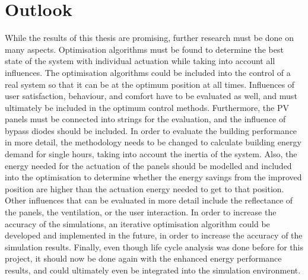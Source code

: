 \chapter{Outlook}
\label{ch:outlook}

While the results of this thesis are promising, further research must be done on many aspects. Optimisation algorithms must be found to determine the best state of the system with individual actuation while taking into account all influences. The optimisation algorithms could be included into the control of a real system so that it can be at the optimum position at all times. Influences of user satisfaction, behaviour, and comfort have to be evaluated as well, and must ultimately be included in the optimum control methods. Furthermore, the PV panels must be connected into strings for the evaluation, and the influence of bypass diodes should be included. In order to evaluate the building performance in more detail, the methodology needs to be changed to calculate building energy demand for single hours, taking into account the inertia of the system. Also, the energy needed for the actuation of the panels should be modelled and included into the optimisation to determine whether the energy savings from the improved position are higher than the actuation energy needed to get to that position. Other influences that can be evaluated in more detail include the reflectance of the panels, the ventilation, or the user interaction. In order to increase the accuracy of the simulations, an iterative optimisation algorithm could be developed and implemented in the future, in order to increase the accuracy of the simulation results. Finally, even though life cycle analysis was done before for this project, it should now be done again with the enhanced energy performance results, and could ultimately even be integrated into the simulation environment. 





